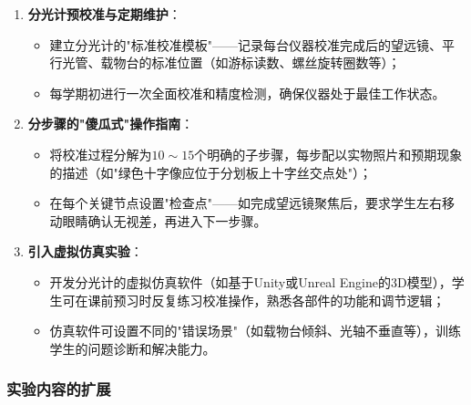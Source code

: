 \documentclass[11pt]{article}
\begin{document}
\begin{enumerate}
    \item \textbf{分光计预校准与定期维护}：
    \begin{itemize}
        \item 建立分光计的"标准校准模板"——记录每台仪器校准完成后的望远镜、平行光管、载物台的标准位置（如游标读数、螺丝旋转圈数等）；
        \item 每学期初进行一次全面校准和精度检测，确保仪器处于最佳工作状态。
    \end{itemize}
    
    \item \textbf{分步骤的"傻瓜式"操作指南}：
    \begin{itemize}
        \item 将校准过程分解为$10 \sim 15$个明确的子步骤，每步配以实物照片和预期现象的描述（如"绿色十字像应位于分划板上十字丝交点处"）；
        \item 在每个关键节点设置"检查点"——如完成望远镜聚焦后，要求学生左右移动眼睛确认无视差，再进入下一步骤。
    \end{itemize}
    
    \item \textbf{引入虚拟仿真实验}：
    \begin{itemize}
        \item 开发分光计的虚拟仿真软件（如基于Unity或Unreal Engine的3D模型），学生可在课前预习时反复练习校准操作，熟悉各部件的功能和调节逻辑；
        \item 仿真软件可设置不同的"错误场景"（如载物台倾斜、光轴不垂直等），训练学生的问题诊断和解决能力。
    \end{itemize}
\end{enumerate}

\subsubsection{实验内容的扩展}
\end{document}
